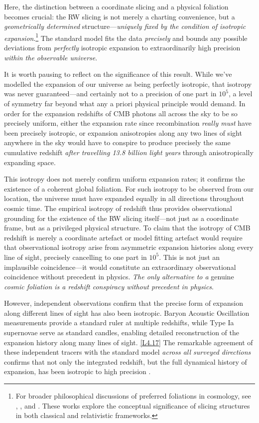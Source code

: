 \documentclass[12pt]{book}
\newcounter{logicanchor}
\newenvironment{logicanchorenv}[1]{\refstepcounter{logicanchor}\label{#1}}{}
\newcommand{\logiclink}[2]{\begin{logicanchorenv}{logic:#1}\end{logicanchorenv}\hyperref[appendix:#1]{[#1]}\xspace}
\begin{document}
Here, the distinction between a coordinate slicing and a physical foliation becomes crucial: the RW slicing is not merely a charting convenience, but a \textit{geometrically determined} structure---\textit{uniquely fixed by the condition of isotropic expansion}.\footnote{For broader philosophical discussions of preferred foliations in cosmology, see \citet{Sklar1995}, \citet{Maudlin2007}, and \citet{ellis2006}. These works explore the conceptual significance of slicing structures in both classical and relativistic frameworks.} The standard model fits the data \textit{precisely} and bounds any possible deviations from \textit{perfectly} isotropic expansion to extraordinarily high precision \textit{within the observable universe}.

It is worth pausing to reflect on the significance of this result. While we've modelled the expansion of our universe as being perfectly isotropic, that isotropy was never guaranteed---and certainly not to a precision of one part in $10^5$, a level of symmetry far beyond what any a priori physical principle would demand. In order for the expansion redshifts of CMB photons all across the sky to be so precisely uniform, either the expansion rate since recombination \textit{really must} have been precisely isotropic, or expansion anisotropies along any two lines of sight anywhere in the sky would have to conspire to produce precisely the same cumulative redshift \textit{after travelling 13.8 billion light years} through anisotropically expanding space. 

This isotropy does not merely confirm uniform expansion rates; it confirms the existence of a coherent global foliation. For such isotropy to be observed from our location, the universe must have expanded equally in all directions throughout cosmic time. The empirical isotropy of redshift thus provides observational grounding for the existence of the RW slicing itself---not just as a coordinate frame, but as a privileged physical structure. To claim that the isotropy of CMB redshift is merely a coordinate artefact or model fitting artefact would require that observational isotropy arise from asymmetric expansion histories along every line of sight, precisely cancelling to one part in $10^5$. This is not just an implausible coincidence---it would constitute an extraordinary observational coincidence without precedent in physics. \textit{The only alternative to a} genuine \textit{cosmic foliation is a redshift conspiracy without precedent in physics}.

However, independent observations confirm that the precise form of expansion along different lines of sight has also been isotropic. Baryon Acoustic Oscillation measurements provide a standard ruler at multiple redshifts, while Type Ia supernovae serve as standard candles, enabling detailed reconstruction of the expansion history along many lines of sight. \logiclink{L4.17}{} The remarkable agreement of these independent tracers with the standard model \textit{across all surveyed directions} confirms that not only the integrated redshift, but the full dynamical history of expansion, has been isotropic to high precision \citep{ellis2006,clarkson2010}.
\end{document}
